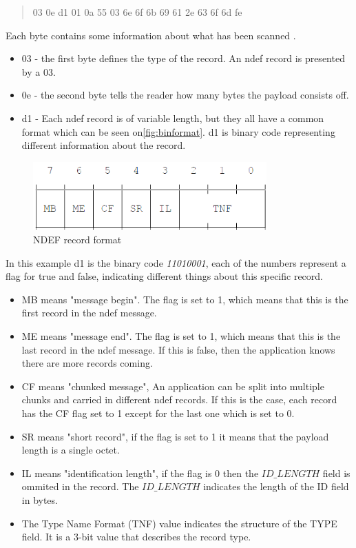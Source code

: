 \begin{quote}
03 0e d1 01 0a 55 03 6e 6f 6b 69 61 2e 63 6f 6d fe
\end{quote}

Each byte contains some information about what has been scanned \citep{ndef}.

\begin{itemize}
\item 03 - the first byte defines the type of the record. An \ac{ndef} record is presented by a 03.
\item 0e - the second byte tells the reader how many bytes the payload consists off.
\item d1 - Each \ac{ndef} record is of variable length, but they all have a common format which can be seen on\autoref{fig:binformat}. d1 is binary code representing different information about the record.
\end{itemize}

\begin{figure}[H]
\centering
\includegraphics[width=0.8\textwidth]{img/binformat.png}
\caption{NDEF record format\citep{ndef}}
\label{fig:binformat}
\end{figure}

In this example d1 is the binary code \textit{11010001}, each of the numbers represent a flag for true and false, indicating different things about this specific record\citep{ndef}. 

\begin{itemize}
\item MB means "message begin". The flag is set to 1, which means that this is the first record in the \ac{ndef} message.
\item ME means "message end". The flag is set to 1, which means that this is the last record in the \ac{ndef} message. If this is false, then the application knows there are more records coming.
\item CF means "chunked message", An application can be split into multiple chunks and carried in different \ac{ndef} records. If this is the case, each record has the CF flag set to 1 except for the last one which is set to 0.
\item SR means "short record", if the flag is set to 1 it means that the payload length is a single octet. 
\item IL means "identification length", if the flag is 0 then the $ID\_LENGTH$ field is ommited in the record. The $ID\_LENGTH$ indicates the length of the ID field in bytes\citep{ndefformat}.
\item The Type Name Format (TNF) value indicates the structure of the TYPE field. It is a 3-bit value that describes the record type\citep{ndefformat}.
\end{itemize}

